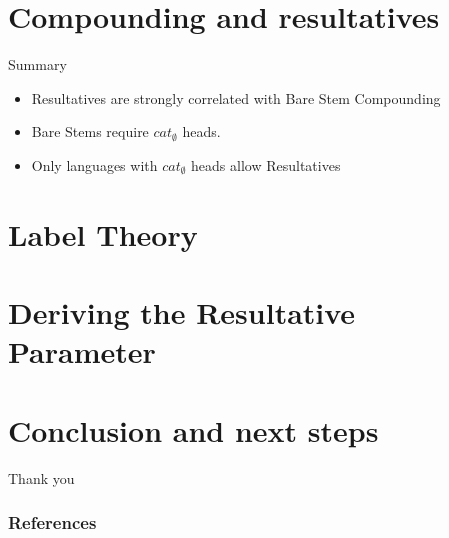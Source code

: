 \documentclass[Proposal]{subfiles}
\begin{document}
\section{Compounding and resultatives}

\begin{frame}
  {Summary}

  \begin{itemize}
    \item Resultatives are strongly correlated with Bare Stem Compounding
    \item Bare Stems require $cat_\emptyset$ heads.
    \item Only languages with $cat_\emptyset$ heads allow Resultatives
  \end{itemize}
\end{frame}
\section{Label Theory}

\section{Deriving the Resultative Parameter}

\section{Conclusion and next steps}

\begin{frame}[plain]
  \begin{center}
    {\Huge Thank you}
  \end{center}
\end{frame}
\begin{frame}[t,allowframebreaks]
  \frametitle{References}
  \printbibliography
\end{frame}
\end{document}
